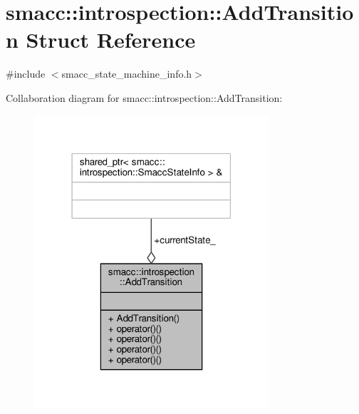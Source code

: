 \hypertarget{structsmacc_1_1introspection_1_1AddTransition}{}\section{smacc\+:\+:introspection\+:\+:Add\+Transition Struct Reference}
\label{structsmacc_1_1introspection_1_1AddTransition}


{\ttfamily \#include $<$smacc\+\_\+state\+\_\+machine\+\_\+info.\+h$>$}



Collaboration diagram for smacc\+:\+:introspection\+:\+:Add\+Transition\+:\nopagebreak
\begin{figure}[H]
\begin{center}
\leavevmode
\includegraphics[width=247pt]{structsmacc_1_1introspection_1_1AddTransition__coll__graph}
\end{center}
\end{figure}
